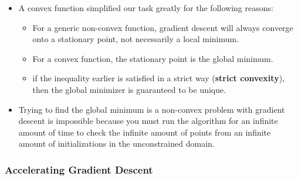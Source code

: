 \documentclass{article}
\newcommand{\tbf}[1]{\textbf{#1}}
\begin{document}
\begin{itemize}
        \item A convex function simplified our task greatly for the following reasons:
        \begin{itemize}
            \item For a generic non-convex function, gradient descent will always converge onto a stationary point, not necessarily a local minimum.
            \item For a convex function, the stationary point is the global minimum.
            \item if the inequality earlier is satisfied in a strict way (\tbf{strict convexity}), then the global minimizer is guaranteed to be unique. 
        \end{itemize}
        \item Trying to find the global minimum is a non-convex problem with gradient descent is impossible because you must run the algorithm for an infinite amount of time to check the infinite amount of points from an infinite amount of initializations in the unconstrained domain. 
        \end{itemize}
        
        \subsubsection{Accelerating Gradient Descent}
\end{document}
